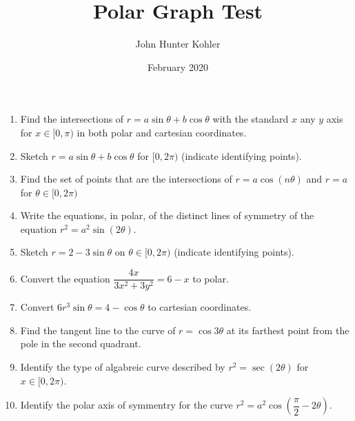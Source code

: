\documentclass{article}
\title{Polar Graph Test}
\author{John Hunter Kohler}
\date{February 2020}
\begin{document}
\maketitle
\begin{enumerate}
	\item{Find the intersections of $r=a\sin\theta+b\cos\theta$ with the standard
		  $x$ any $y$ axis for $x\in[0,\pi)$ in both polar and cartesian coordinates.}
	\item{Sketch $r=a\sin\theta+b\cos\theta$ for $[0,2\pi)$ (indicate identifying points).}
	\item{Find the set of points that are the intersections of $r=a\cos(n\theta)$ and $r=a$ for
		  $\theta\in[0,2\pi)$}
	\item{Write the equations, in polar, of the distinct lines of symmetry of the equation $r^2=a^2\sin(2\theta)$.}
	\item{Sketch $r=2-3\sin\theta$ on $\theta\in[0,2\pi)$ (indicate identifying points).}
	\item{Convert the equation $\dfrac{4x}{3x^2+3y^2}=6-x$ to polar.}
	\item{Convert $6r^3\sin\theta=4-\cos\theta$ to cartesian coordinates.}
	\item{Find the tangent line to the curve of $r=\cos3\theta$ at its farthest point from the pole
		  in the second quadrant.}
	\item{Identify the type of algabreic curve described by $r^2=\sec(2\theta)$ for $x\in[0,2\pi)$.}
	\item{Identify the polar axis of symmentry for the curve $r^2=a^2\cos(\dfrac{\pi}{2}-2\theta)$.}

\end{enumerate}
\end{document}
